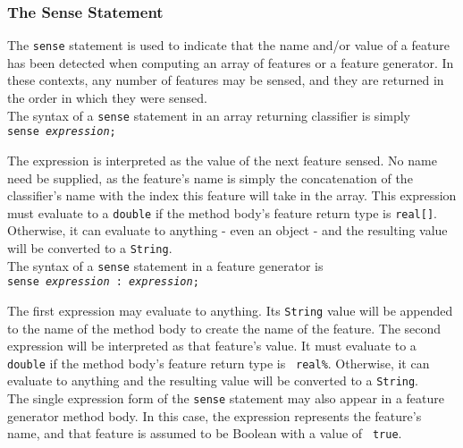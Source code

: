 \subsubsection{The Sense Statement} \label{subsection:senseStatement}
The {\tt sense} statement is used to indicate that the name and/or value of a
feature has been detected when computing an array of features or a feature
generator.  In these contexts, any number of features may be sensed, and they
are returned in the order in which they were sensed. \\

The syntax of a {\tt sense} statement in an array returning classifier is
simply \\

\vspace{-.25cm}
{\tt sense \emph{expression};} \\
\vspace{-.25cm}

\noindent
The expression is interpreted as the value of the next feature sensed.  No
name need be supplied, as the feature's name is simply the concatenation of
the classifier's name with the index this feature will take in the array.
This expression must evaluate to a {\tt double} if the method body's feature
return type is {\tt real[]}.  Otherwise, it can evaluate to anything - even an
object - and the resulting value will be converted to a {\tt String}. \\

The syntax of a {\tt sense} statement in a feature generator is \\

\vspace{-.25cm}
{\tt sense \emph{expression} :{\tiny{ }}\emph{expression};} \\
\vspace{-.25cm}

\noindent
The first expression may evaluate to anything.  Its {\tt String} value will be
appended to the name of the method body to create the name of the feature.
The second expression will be interpreted as that feature's value.  It must
evaluate to a {\tt double} if the method body's feature return type is {\tt
real\%}.  Otherwise, it can evaluate to anything and the resulting value will
be converted to a {\tt String}. \\

The single expression form of the {\tt sense} statement may also appear in a
feature generator method body.  In this case, the expression represents the
feature's name, and that feature is assumed to be Boolean with a value of {\tt
true}.

